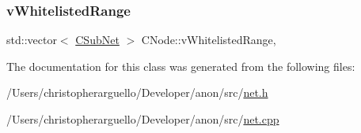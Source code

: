 \subsubsection{\texorpdfstring{v\+Whitelisted\+Range}{vWhitelistedRange}}
{\footnotesize\ttfamily std\+::vector$<$ \mbox{\hyperlink{class_c_sub_net}{C\+Sub\+Net}} $>$ C\+Node\+::v\+Whitelisted\+Range\hspace{0.3cm}{\ttfamily [static]}, {\ttfamily [protected]}}



The documentation for this class was generated from the following files\+:\begin{DoxyCompactItemize}
\item 
/\+Users/christopherarguello/\+Developer/anon/src/\mbox{\hyperlink{net_8h}{net.\+h}}\item 
/\+Users/christopherarguello/\+Developer/anon/src/\mbox{\hyperlink{net_8cpp}{net.\+cpp}}\end{DoxyCompactItemize}
